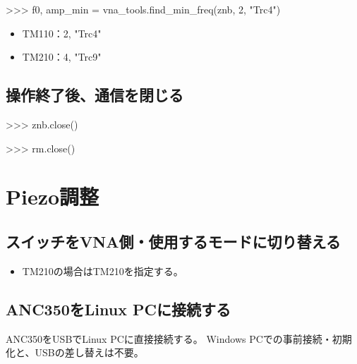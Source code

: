 \documentclass[a4paper,11pt]{ltjsarticle}
\begin{document}
\begin{command}

>>> f0, amp_min = vna_tools.find_min_freq(znb, 2, "Trc4")

\end{command}

\begin{itemize}

\item TM110：2, "Trc4"

\item TM210：4, "Trc9"

\end{itemize}

\subsection{操作終了後、通信を閉じる}

\begin{command}

>>> znb.close()

>>> rm.close()

\end{command}

\section{Piezo調整}

\subsection{スイッチをVNA側・使用するモードに切り替える}

\begin{command}


\end{command}

\begin{itemize}

\item TM210の場合はTM210を指定する。

\end{itemize}

\subsection{ANC350をLinux PCに接続する}

ANC350をUSBでLinux PCに直接接続する。
Windows PCでの事前接続・初期化と、USBの差し替えは不要。
\end{document}
